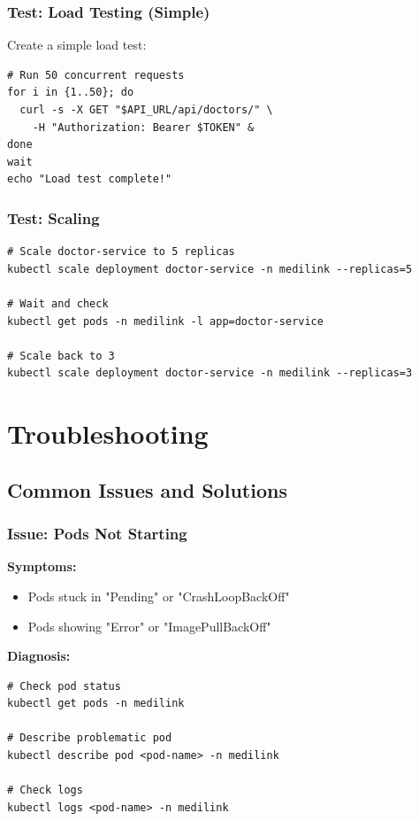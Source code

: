 \documentclass[12pt,a4paper]{article}
\begin{document}
\subsubsection{Test: Load Testing (Simple)}
Create a simple load test:

\begin{lstlisting}[style=bash]
# Run 50 concurrent requests
for i in {1..50}; do
  curl -s -X GET "$API_URL/api/doctors/" \
    -H "Authorization: Bearer $TOKEN" &
done
wait
echo "Load test complete!"
\end{lstlisting}

\subsubsection{Test: Scaling}
\begin{lstlisting}[style=bash]
# Scale doctor-service to 5 replicas
kubectl scale deployment doctor-service -n medilink --replicas=5

# Wait and check
kubectl get pods -n medilink -l app=doctor-service

# Scale back to 3
kubectl scale deployment doctor-service -n medilink --replicas=3
\end{lstlisting}

\section{Troubleshooting}
\label{sec:troubleshooting}

\subsection{Common Issues and Solutions}

\subsubsection{Issue: Pods Not Starting}

\textbf{Symptoms:}
\begin{itemize}
    \item Pods stuck in "Pending" or "CrashLoopBackOff"
    \item Pods showing "Error" or "ImagePullBackOff"
\end{itemize}

\textbf{Diagnosis:}
\begin{lstlisting}[style=bash]
# Check pod status
kubectl get pods -n medilink

# Describe problematic pod
kubectl describe pod <pod-name> -n medilink

# Check logs
kubectl logs <pod-name> -n medilink
\end{lstlisting}
\end{document}

